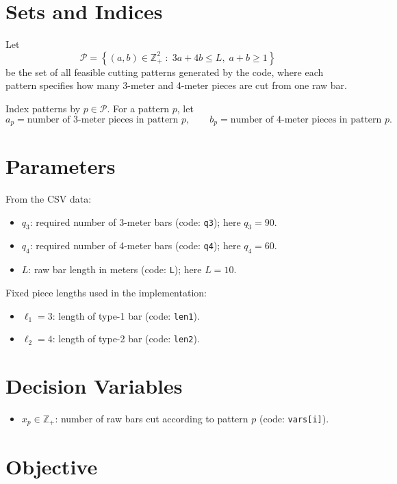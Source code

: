 \section*{Sets and Indices}

Let
\[
\mathcal{P}=\left\{(a,b)\in \mathbb{Z}_{+}^{2} \;:\; 3a+4b \le L,\; a+b \ge 1\right\}
\]
be the set of all feasible cutting patterns generated by the code, where each pattern specifies how many 3-meter and 4-meter pieces are cut from one raw bar.

Index patterns by \(p \in \mathcal{P}\). For a pattern \(p\), let
\[
a_p = \text{number of 3-meter pieces in pattern } p,\qquad
b_p = \text{number of 4-meter pieces in pattern } p.
\]

\section*{Parameters}

From the CSV data:

\begin{itemize}
    \item \(q_3\): required number of 3-meter bars (code: \texttt{q3}); here \(q_3=90\).
    \item \(q_4\): required number of 4-meter bars (code: \texttt{q4}); here \(q_4=60\).
    \item \(L\): raw bar length in meters (code: \texttt{L}); here \(L=10\).
\end{itemize}

Fixed piece lengths used in the implementation:

\begin{itemize}
    \item \(\ell_1 = 3\): length of type-1 bar (code: \texttt{len1}).
    \item \(\ell_2 = 4\): length of type-2 bar (code: \texttt{len2}).
\end{itemize}

\section*{Decision Variables}

\begin{itemize}
    \item \(x_p \in \mathbb{Z}_{+}\): number of raw bars cut according to pattern \(p\) (code: \texttt{vars[i]}).
\end{itemize}

\section*{Objective}

